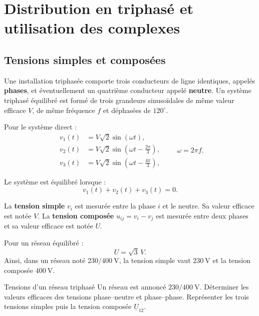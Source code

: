\section{Distribution en triphasé et utilisation des complexes}
\label{sec:masms-1}

\subsection{Tensions simples et composées}

Une installation triphasée comporte trois conducteurs de ligne identiques, appelés \textbf{phases}, et éventuellement un quatrième conducteur appelé \textbf{neutre}. Un système triphasé équilibré est formé de trois grandeurs sinusoïdales de même valeur efficace $V$, de même fréquence $f$ et déphasées de $120^\circ$.

Pour le système direct :
\[
\begin{aligned}
v_1(t)&=V\sqrt2\sin(\omega t),\\
v_2(t)&=V\sqrt2\sin\left(\omega t-\frac{2\pi}{3}\right),\\
v_3(t)&=V\sqrt2\sin\left(\omega t-\frac{4\pi}{3}\right),
\end{aligned}
\qquad \omega=2\pi f.
\]

Le système est équilibré lorsque :
\[
\boxed{v_1(t)+v_2(t)+v_3(t)=0.}
\]

La \textbf{tension simple} $v_i$ est mesurée entre la phase $i$ et le neutre. Sa valeur efficace est notée $V$. La \textbf{tension composée} $u_{ij}=v_i-v_j$ est mesurée entre deux phases et sa valeur efficace est notée $U$.

\begin{center}\TLTriphasageSimpleCompose\end{center}

Pour un réseau équilibré :
\[
\boxed{U=\sqrt3\,V.}
\]
Ainsi, dans un réseau noté $230/400\ \mathrm V$, la tension simple vaut $230\ \mathrm V$ et la tension composée $400\ \mathrm V$.


\begin{TLMachineExercise}{Tensions d'un réseau triphasé}
Un réseau est annoncé $230/400\ \mathrm V$. Déterminer les valeurs efficaces des tensions phase--neutre et phase--phase. Représenter les trois tensions simples puis la tension composée $\underline U_{12}$.
\end{TLMachineExercise}

